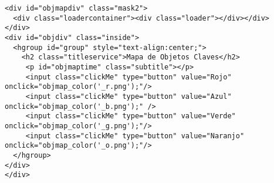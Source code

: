 \begin{enumerate}[label=\alph*) ,font=\bfseries]
\begin{lstlisting}[style=Java, caption={Contenido \textit{HTML} donde se aloja el Mapa de Objetos.}]
  <div id="objmapdiv" class="mask2">
  <div class="loadercontainer"><div class="loader"></div></div>
</div>
<div id="objdiv" class="inside">
  <hgroup id="group" style="text-align:center;">
    <h2 class="titleservice">Mapa de Objetos Claves</h2>
     <p id="objmaptime" class="subtitle"></p>
     <input class="clickMe" type="button" value="Rojo" onclick="objmap_color('_r.png');"/>
     <input class="clickMe" type="button" value="Azul" onclick="objmap_color('_b.png');" />
     <input class="clickMe" type="button" value="Verde" onclick="objmap_color('_g.png');"/>
     <input class="clickMe" type="button" value="Naranjo" onclick="objmap_color('_o.png');"/> 
  </hgroup>
</div>                        
</div>
\end{lstlisting}
\end{enumerate}


\newpage
